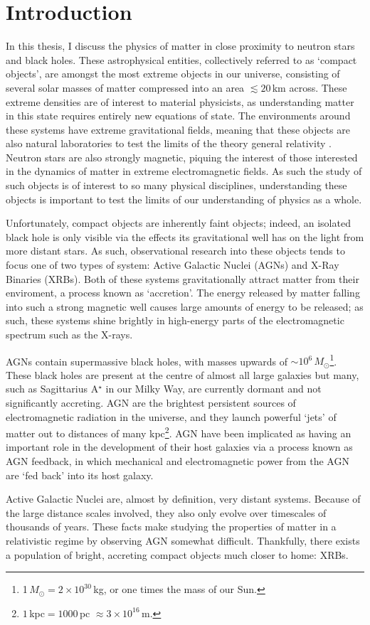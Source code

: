\chapter{Introduction}

\par In this thesis, I discuss the physics of matter in close proximity to neutron stars and black holes.  These astrophysical entities, collectively referred to as `compact objects',  are amongst the most extreme objects in our universe, consisting of several solar masses of matter compressed into an area $\lesssim20$\,km across.  These extreme densities are of interest to material physicists, as understanding matter in this state requires entirely new equations of state.  The environments around these systems have extreme gravitational fields, meaning that these objects are also natural laboratories to test the limits of the theory general relativity \citep{Einstein_GR}.  Neutron stars are also strongly magnetic, piquing the interest of those interested in the dynamics of matter in extreme electromagnetic fields.  As such the study of such objects is of interest to so many physical disciplines, understanding these objects is important to test the limits of our understanding of physics as a whole.
\par Unfortunately, compact objects are inherently faint objects; indeed, an isolated black hole is only visible via the effects its gravitational well has on the light from more distant stars.  As such, observational research into these objects tends to focus one of two types of system: Active Galactic Nuclei (AGNs) and X-Ray Binaries (XRBs).  Both of these systems gravitationally attract matter from their enviroment, a process known as `accretion'.  The energy released by matter falling into such a strong magnetic well causes large amounts of energy to be released; as such, these systems shine brightly in high-energy parts of the electromagnetic spectrum such as the X-rays.
\par AGNs contain supermassive black holes, with masses upwards of $\sim10^6$\,$M_\odot$\footnote{1\,$M_\odot=2\times10^{30}$\,kg, or one times the mass of our Sun.}.  These black holes are present at the centre of almost all large galaxies but many, such as Sagittarius A$^\star$ in our Milky Way, are currently dormant and not significantly accreting.  AGN are the brightest persistent sources of electromagnetic radiation in the universe, and they launch powerful `jets' of matter out to distances of many kpc\footnote{$1$\,kpc$ =1000$\,pc $\approx3\times10^{16}$\,m.}.  AGN have been implicated as having an important role in the development of their host galaxies via a process known as AGN feedback, in which mechanical and electromagnetic power from the AGN are `fed back' into its host galaxy.
\par Active Galactic Nuclei are, almost by definition, very distant systems.  Because of the large distance scales involved, they also only evolve over timescales of thousands of years.  These facts make studying the properties of matter in a relativistic regime by observing AGN somewhat difficult.  Thankfully, there exists a population of bright, accreting compact objects much closer to home: XRBs.

